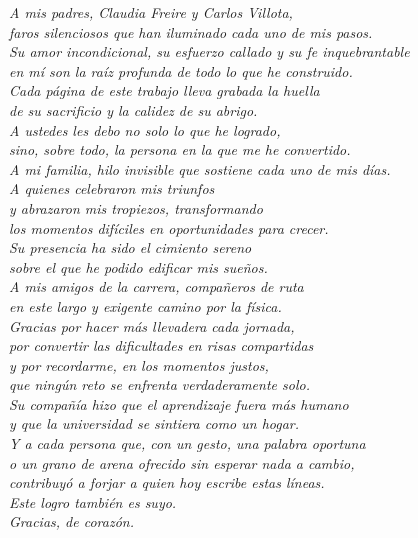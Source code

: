 \documentclass[12pt, spanish]{book}
\begin{document}
\begin{flushright}
\textit{A mis padres, Claudia Freire y Carlos Villota,\\
faros silenciosos que han iluminado cada uno de mis pasos.\\
Su amor incondicional, su esfuerzo callado y su fe inquebrantable\\
en mí son la raíz profunda de todo lo que he construido.\\
Cada página de este trabajo lleva grabada la huella\\
de su sacrificio y la calidez de su abrigo.\\
A ustedes les debo no solo lo que he logrado,\\
sino, sobre todo, la persona en la que me he convertido.}\\[0.8cm]

\textit{A mi familia, hilo invisible que sostiene cada uno de mis días.\\
A quienes celebraron mis triunfos\\
y abrazaron mis tropiezos, transformando\\
los momentos difíciles en oportunidades para crecer.\\
Su presencia ha sido el cimiento sereno\\
sobre el que he podido edificar mis sueños.}\\[0.8cm]

\textit{A mis amigos de la carrera, compañeros de ruta\\
en este largo y exigente camino por la física.\\
Gracias por hacer más llevadera cada jornada,\\
por convertir las dificultades en risas compartidas\\
y por recordarme, en los momentos justos,\\
que ningún reto se enfrenta verdaderamente solo.\\
Su compañía hizo que el aprendizaje fuera más humano\\
y que la universidad se sintiera como un hogar.}\\[0.8cm]

\textit{Y a cada persona que, con un gesto, una palabra oportuna\\
o un grano de arena ofrecido sin esperar nada a cambio,\\
contribuyó a forjar a quien hoy escribe estas líneas.\\
Este logro también es suyo.}\\[0.8cm]

\textit{Gracias, de corazón.}
\end{flushright}
\end{document}
